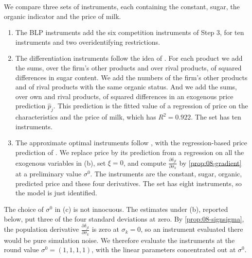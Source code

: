 We compare three sets of instruments, each containing the constant, sugar, the organic indicator and the price of milk.
\begin{enumerate}[label=(\alph*)]
  \item The BLP instruments add the six competition instruments of Step 3, for ten instruments and two
  overidentifying restrictions.
  \item The differentiation instruments follow the idea of \citet{GandhiHoude2019}. For each product we add the sums, over
  the firm's other products and over rival products, of squared differences in sugar content. We add the numbers of the
  firm's other products and of rival products with the same organic status. And we add the sums, over own and rival
  products, of squared differences in an exogenous price prediction $\hat p_j$. This prediction is the fitted value of a
  regression of price on the characteristics and the price of milk, which has $R^2 = 0.922$. The set has ten instruments.
  \item The approximate optimal instruments follow \citet[Appendix]{BerryLevinsohnPakes1999}, with the
  regression-based price prediction of \citet[Section~2.4]{ReynaertVerboven2014}. We replace price by its prediction from a regression on all the exogenous variables in
  (b), set $\xi = 0$, and compute $\frac{\partial\delta_{jt}}{\partial\sigma_k}$ by \cref{prop:08-gradient} at a
  preliminary value $\sigma^0$. The instruments are the constant, sugar, organic, predicted price and these four
  derivatives. The set has eight instruments, so the model is just identified.
\end{enumerate}
The choice of $\sigma^0$ in (c) is not innocuous. The estimates under (b), reported below, put three of the four
standard deviations at zero. By \cref{prop:08-signsigma}, the population derivative
$\frac{\partial\delta_{jt}}{\partial\sigma_k}$ is zero at $\sigma_k = 0$, so an instrument evaluated there would be
pure simulation noise. We therefore evaluate the instruments at the round value $\sigma^0 = (1, 1, 1, 1)$, with the
linear parameters concentrated out at $\sigma^0$.


